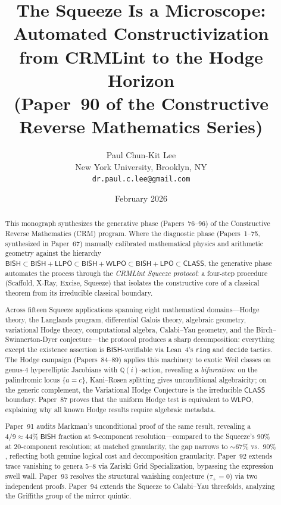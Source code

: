 \documentclass[11pt]{article}
\title{The Squeeze Is a Microscope:\\
  Automated Constructivization from CRMLint to the Hodge Horizon\\[6pt]
  \large (Paper~90 of the Constructive Reverse Mathematics Series)}
\author{Paul Chun-Kit Lee \\[2pt]
\normalsize New York University, Brooklyn, NY \\[2pt]
\normalsize \texttt{dr.paul.c.lee@gmail.com}}
\date{February 2026}
\theoremstyle{plain}
\theoremstyle{definition}
\theoremstyle{remark}
\newcommand{\QQ}{\mathbb{Q}}
\newcommand{\BISH}{\mathsf{BISH}}
\newcommand{\LPO}{\mathsf{LPO}}
\newcommand{\WLPO}{\mathsf{WLPO}}
\newcommand{\LLPO}{\mathsf{LLPO}}
\newcommand{\CLASS}{\mathsf{CLASS}}
\begin{document}
\maketitle


\begin{abstract}
This monograph synthesizes the generative phase (Papers~76--96) of
the Constructive Reverse Mathematics (CRM) program.  Where the
diagnostic phase (Papers~1--75, synthesized in Paper~67) manually
calibrated mathematical physics and arithmetic geometry against the
hierarchy
$\BISH \subset \BISH + \LLPO \subset \BISH + \WLPO \subset
\BISH + \LPO \subset \CLASS$,
the generative phase automates the process through the \emph{CRMLint
Squeeze protocol}: a four-step procedure (Scaffold, X-Ray, Excise,
Squeeze) that isolates the constructive core of a classical theorem
from its irreducible classical boundary.

Across fifteen Squeeze applications spanning eight mathematical
domains---Hodge theory, the Langlands program, differential Galois
theory, algebraic geometry, variational Hodge theory, computational
algebra, Calabi--Yau geometry, and the Birch--Swinnerton-Dyer
conjecture---the protocol produces a sharp
decomposition: everything except the existence assertion
is $\BISH$-verifiable via Lean~4's \texttt{ring} and
\texttt{decide} tactics.  The Hodge campaign (Papers~84--89) applies
this machinery to exotic Weil classes on genus-4 hyperelliptic
Jacobians with $\QQ(i)$-action, revealing a \emph{bifurcation}: on
the palindromic locus $\{a = c\}$, Kani--Rosen splitting gives
unconditional algebraicity; on the generic complement, the Variational
Hodge Conjecture is the irreducible $\CLASS$ boundary.  Paper~87
proves that the uniform Hodge test is equivalent to $\WLPO$,
explaining why all known Hodge results require algebraic metadata.

Paper~91 audits Markman's unconditional proof of the same result,
revealing a $4/9 \approx 44\%\;\BISH$ fraction at 9-component
resolution---compared to the Squeeze's $90\%$ at 20-component
resolution; at matched granularity, the gap narrows to ${\sim}67\%$
vs.\ $90\%$, reflecting both genuine logical cost and decomposition
granularity.  Paper~92 extends trace vanishing to genera 5--8
via Zariski Grid Specialization, bypassing the expression swell wall.
Paper~93 resolves the structural vanishing conjecture ($\tau_+ = 0$)
via two independent proofs.  Paper~94 extends the Squeeze to
Calabi--Yau threefolds, analyzing the Griffiths group of the mirror
quintic.


\end{abstract}
\end{document}
